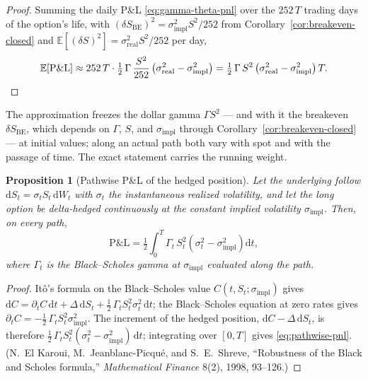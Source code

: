 \documentclass[11pt]{book}
\theoremstyle{plain}
\newtheorem{proposition}[theorem]{Proposition}
\theoremstyle{definition}
\theoremstyle{remark}
\newcommand{\dd}{\mathrm{d}}                                  %
\newcommand{\E}{\mathbb{E}}
\begin{document}
\begin{proof}
Summing the daily P\&L \eqref{eq:gamma-theta-pnl} over the $252\,T$ trading days of the option's life, with $(\delta S_{\mathrm{BE}})^2 = \sigma_{\mathrm{impl}}^2 S^2/252$ from Corollary~\ref{cor:breakeven-closed} and $\E[(\delta S)^2] = \sigma_{\mathrm{real}}^2 S^2/252$ per day,
\begin{equation}
\E[\mathrm{P\&L}] \approx 252\,T \cdot \tfrac12\,\Gamma\,\frac{S^2}{252}\left(\sigma_{\mathrm{real}}^2 - \sigma_{\mathrm{impl}}^2\right)
= \tfrac12\,\Gamma\,S^2\left(\sigma_{\mathrm{real}}^2 - \sigma_{\mathrm{impl}}^2\right) T .
\qedhere
\end{equation}
\end{proof}

The approximation freezes the dollar gamma $\Gamma S^2$ --- and with it the breakeven $\delta S_{\mathrm{BE}}$, which depends on $\Gamma$, $S$, and $\sigma_{\mathrm{impl}}$ through Corollary~\ref{cor:breakeven-closed} --- at initial values; along an actual path both vary with spot and with the passage of time. The exact statement carries the running weight.

\begin{proposition}[Pathwise P\&L of the hedged position]
\label{prop:pathwise-pnl}
Let the underlying follow $\dd S_t = \sigma_t S_t\,\dd W_t$ with $\sigma_t$ the instantaneous realized volatility, and let the long option be delta-hedged continuously at the constant implied volatility $\sigma_{\mathrm{impl}}$. Then, on every path,
\begin{equation}
\mathrm{P\&L} = \tfrac12 \int_0^T \Gamma_t\,S_t^2 \left(\sigma_t^2 - \sigma_{\mathrm{impl}}^2\right) \dd t,
\label{eq:pathwise-pnl}
\end{equation}
where $\Gamma_t$ is the Black--Scholes gamma at $\sigma_{\mathrm{impl}}$ evaluated along the path.
\end{proposition}

\begin{proof}
It\^o's formula on the Black--Scholes value $C(t, S_t; \sigma_{\mathrm{impl}})$ gives $\dd C = \partial_t C\,\dd t + \Delta\,\dd S_t + \tfrac12\,\Gamma_t S_t^2 \sigma_t^2\,\dd t$; the Black--Scholes equation at zero rates gives $\partial_t C = -\tfrac12\,\Gamma_t S_t^2 \sigma_{\mathrm{impl}}^2$. The increment of the hedged position, $\dd C - \Delta\,\dd S_t$, is therefore $\tfrac12\,\Gamma_t S_t^2 (\sigma_t^2 - \sigma_{\mathrm{impl}}^2)\,\dd t$; integrating over $[0,T]$ gives \eqref{eq:pathwise-pnl}. (N.~El Karoui, M.~Jeanblanc-Picqu\'e, and S.~E.~Shreve, ``Robustness of the Black and Scholes formula,'' \emph{Mathematical Finance} 8(2), 1998, 93--126.)
\end{proof}
\end{document}
